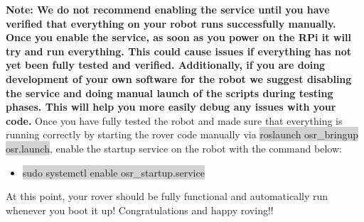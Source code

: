 \documentclass{article}
\begin{document}
\textbf{Note: We do not recommend enabling the service until you have verified that everything on your robot runs successfully manually.  Once you enable the service, as soon as you power on the RPi it will try and run everything. This could cause issues if everything has not yet been fully tested and verified. Additionally, if you are doing development of your own software for the robot we suggest disabling the service and doing manual launch of the scripts during testing phases. This will help you more easily debug any issues with your code.} Once you have fully tested the robot and made sure that everything is running correctly by starting the rover code manually via \colorbox{lightgray}{roslaunch osr\_bringup osr.launch}, enable the startup service on the robot with the command below:

\begin{itemize}
	\item[] \colorbox{lightgray}{sudo systemctl enable osr\_startup.service}
\end{itemize}

At this point, your rover should be fully functional and automatically run whenever you boot it up!  Congratulations and happy roving!!
\end{document}
